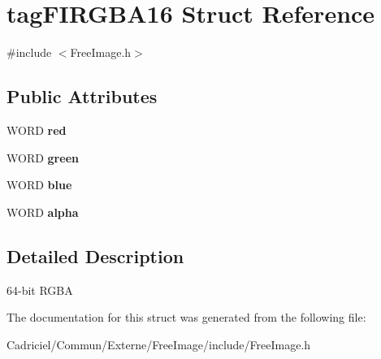 \hypertarget{structtag_f_i_r_g_b_a16}{}\section{tag\+F\+I\+R\+G\+B\+A16 Struct Reference}
\label{structtag_f_i_r_g_b_a16}


{\ttfamily \#include $<$Free\+Image.\+h$>$}

\subsection*{Public Attributes}
\begin{DoxyCompactItemize}
\item 
W\+O\+RD {\bfseries red}\hypertarget{structtag_f_i_r_g_b_a16_a580143c8b2f5e28721972342a6facd01}{}\label{structtag_f_i_r_g_b_a16_a580143c8b2f5e28721972342a6facd01}

\item 
W\+O\+RD {\bfseries green}\hypertarget{structtag_f_i_r_g_b_a16_a0ae72ef6b7fe786b9ea6068579cd3f2d}{}\label{structtag_f_i_r_g_b_a16_a0ae72ef6b7fe786b9ea6068579cd3f2d}

\item 
W\+O\+RD {\bfseries blue}\hypertarget{structtag_f_i_r_g_b_a16_afe4aa863b00988ad24831a1432ef837e}{}\label{structtag_f_i_r_g_b_a16_afe4aa863b00988ad24831a1432ef837e}

\item 
W\+O\+RD {\bfseries alpha}\hypertarget{structtag_f_i_r_g_b_a16_a9875250254b19efbfb321bf33ae2fdf6}{}\label{structtag_f_i_r_g_b_a16_a9875250254b19efbfb321bf33ae2fdf6}

\end{DoxyCompactItemize}


\subsection{Detailed Description}
64-\/bit R\+G\+BA 

The documentation for this struct was generated from the following file\+:\begin{DoxyCompactItemize}
\item 
Cadriciel/\+Commun/\+Externe/\+Free\+Image/include/Free\+Image.\+h\end{DoxyCompactItemize}
